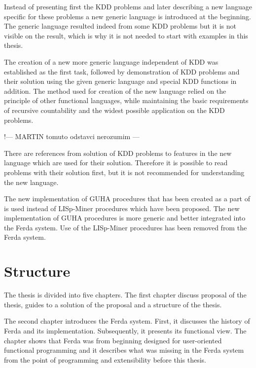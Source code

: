 \documentclass[a4paper,12pt]{book}
\begin{document}
Instead of presenting first the KDD problems and later describing a new language specific for these problems a new generic language is introduced at the beginning. The generic language resulted indeed from some KDD problems but it is not visible on the result, which is why it is not needed to start with examples in this thesis.

The creation of a new more generic language independent of KDD was established as the first task, followed by demonstration of KDD problems and their solution using the given generic language and special KDD functions in addition. The method used for creation of the new language relied on the principle of other functional languages, while maintaining the basic requirements of recursive countability and the widest possible application on the KDD problems.

!--- MARTIN tomuto odstavci nerozumim ---

There are references from solution of KDD problems to features in the new language which are used for their solution. Therefore it is possible to read problems with their solution first, but it is not recommended for understanding the new language.


The new implementation of GUHA procedures that has been created as a part of \cite[diploma thesis of Tomáš Kuchař]{thesisKuchar} is used instead of LISp-Miner procedures which have been proposed. The new implementation of GUHA procedures is more generic and better integrated into the Ferda system. Use of the LISp-Miner procedures has been removed from the Ferda system.

\section{Structure}
The thesis is divided into five chapters. The first chapter discuss proposal of the thesis, guides to a solution of the proposal and a structure of the thesis.

The second chapter introduces the Ferda system. First, it discusses the history of Ferda and its implementation. Subsequently, it presents its functional view. The chapter shows that Ferda was from beginning designed for user-oriented functional programming and it describes what was missing in the Ferda system from the point of programming and extensibility before this thesis.
\end{document}
